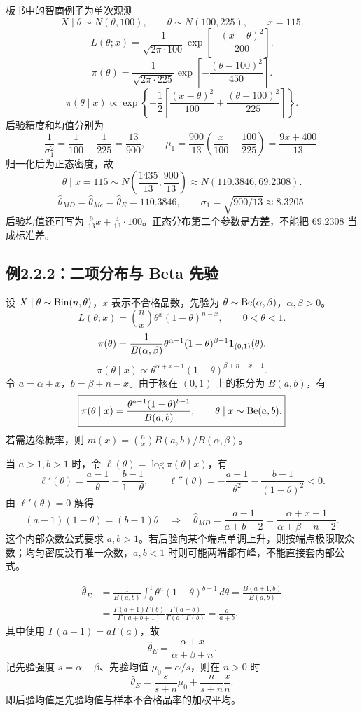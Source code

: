 板书中的智商例子为单次观测
\[
X\mid\theta\sim N(\theta,100),\qquad\theta\sim N(100,225),\qquad x=115.
\]
\[
L(\theta;x)=\frac1{\sqrt{2\pi\cdot100}}
\exp\left[-\frac{(x-\theta)^2}{200}\right].
\]
\[
\pi(\theta)=\frac1{\sqrt{2\pi\cdot225}}
\exp\left[-\frac{(\theta-100)^2}{450}\right].
\]
\[
\pi(\theta\mid x)\propto
\exp\left\{-\frac12\left[\frac{(x-\theta)^2}{100}
+\frac{(\theta-100)^2}{225}\right]\right\}.
\]
后验精度和均值分别为
\[
\frac1{\sigma_1^2}=\frac1{100}+\frac1{225}=\frac{13}{900},\qquad
\mu_1=\frac{900}{13}\left(\frac{x}{100}+\frac{100}{225}\right)
=\frac{9x+400}{13}.
\]
归一化后为正态密度，故
\[
\theta\mid x=115\sim N\left(\frac{1435}{13},\frac{900}{13}\right)
\approx N(110.3846,69.2308).
\]
\[
\boxed{\hat\theta_{MD}=\hat\theta_{Me}=\hat\theta_E=110.3846,\qquad
\sigma_1=\sqrt{900/13}\approx8.3205.}
\]
后验均值还可写为 $\frac9{13}x+\frac4{13}\cdot100$。正态分布第二个参数是\textbf{方差}，不能把 $69.2308$ 当成标准差。

\subsection{例2.2.2：二项分布与 Beta 先验}
设 $X\mid\theta\sim\operatorname{Bin}(n,\theta)$，$x$ 表示不合格品数，先验为 $\theta\sim\operatorname{Be}(\alpha,\beta)$，$\alpha,\beta>0$。
\[
L(\theta;x)=\binom nx\theta^x(1-\theta)^{n-x},\qquad 0<\theta<1.
\]
\[
\pi(\theta)=\frac1{B(\alpha,\beta)}
\theta^{\alpha-1}(1-\theta)^{\beta-1}\mathbf{1}_{(0,1)}(\theta).
\]
\[
\pi(\theta\mid x)\propto
\theta^{\alpha+x-1}(1-\theta)^{\beta+n-x-1}.
\]
令 $a=\alpha+x$，$b=\beta+n-x$。由于核在 $(0,1)$ 上的积分为 $B(a,b)$，有
\[
\boxed{\pi(\theta\mid x)=\frac{\theta^{a-1}(1-\theta)^{b-1}}{B(a,b)},\qquad
\theta\mid x\sim\operatorname{Be}(a,b).}
\]
若需边缘概率，则 $m(x)=\binom nx B(a,b)/B(\alpha,\beta)$。

当 $a>1,b>1$ 时，令 $\ell(\theta)=\log\pi(\theta\mid x)$，有
\[
\ell'(\theta)=\frac{a-1}{\theta}-\frac{b-1}{1-\theta},\qquad
\ell''(\theta)=-\frac{a-1}{\theta^2}-\frac{b-1}{(1-\theta)^2}<0.
\]
由 $\ell'(\theta)=0$ 解得
\[
(a-1)(1-\theta)=(b-1)\theta
\quad\Longrightarrow\quad
\boxed{\hat\theta_{MD}=\frac{a-1}{a+b-2}
=\frac{\alpha+x-1}{\alpha+\beta+n-2}.}
\]
这个内部众数公式要求 $a,b>1$。若后验向某个端点单调上升，则按端点极限取众数；均匀密度没有唯一众数，$a,b<1$ 时则可能两端都有峰，不能直接套内部公式。

\begin{align*}
\hat\theta_E
&=\frac1{B(a,b)}\int_0^1\theta^a(1-\theta)^{b-1}\,d\theta
=\frac{B(a+1,b)}{B(a,b)}\\
&=\frac{\Gamma(a+1)\Gamma(b)}{\Gamma(a+b+1)}
\frac{\Gamma(a+b)}{\Gamma(a)\Gamma(b)}
=\frac{a}{a+b}.
\end{align*}
其中使用 $\Gamma(a+1)=a\Gamma(a)$，故
\[
\boxed{\hat\theta_E=\frac{\alpha+x}{\alpha+\beta+n}.}
\]
记先验强度 $s=\alpha+\beta$、先验均值 $\mu_0=\alpha/s$，则在 $n>0$ 时
\[
\hat\theta_E=\frac{s}{s+n}\mu_0+\frac n{s+n}\frac xn.
\]
即后验均值是先验均值与样本不合格品率的加权平均。

